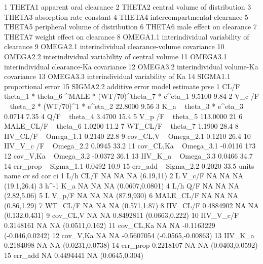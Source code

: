 \begin{Schunk}
\begin{Soutput}
1     THETA1                       apparent oral clearance
2     THETA2                central volume of distribution
3     THETA3                      absorption rate constant
4     THETA4                  intercompartmental clearance
5     THETA5             peripheral volume of distribution
6     THETA6                      male effect on clearance
7     THETA7                    weight effect on clearance
8   OMEGA1.1      interindividual variability of clearance
9   OMEGA2.1   interindividual clearance-volume covariance
10  OMEGA2.2 interindividual variability of central volume
11  OMEGA3.1       interindividual clearance-Ka covariance
12  OMEGA3.2          interindividual volume-Ka covariance
13  OMEGA3.3             interindividual variability of Ka
14  SIGMA1.1                            proportional error
15  SIGMA2.2                                additive error
                                                           model estimate prse
1  CL/F  ~ theta_1 *  theta_6 ^MALE * (WT/70)^theta_7  * e^eta_1   9.5100 9.84
2                        V_c /F  ~ theta_2 * (WT/70)^1 * e^eta_2  22.8000 9.56
3                                       K_a  ~ theta_3 * e^eta_3   0.0714 7.35
4                                                 Q/F  ~ theta_4   3.4700 15.4
5                                              V_p /F  ~ theta_5 113.0000   21
6                                            MALE_CL/F ~ theta_6   1.0200 11.2
7                                              WT_CL/F ~ theta_7   1.1900 28.4
8                                           IIV_CL/F ~ Omega_1.1   0.2140 22.8
9                                           cov_CL,V ~ Omega_2.1   0.1210 26.4
10                                        IIV_V_c /F ~ Omega_2.2   0.0945 33.2
11                                        cov_CL,Ka  ~ Omega_3.1  -0.0116  173
12                                         cov_V,Ka  ~ Omega_3.2  -0.0372 36.1
13                                          IIV_K_a  ~ Omega_3.3   0.0466 34.7
14                                          err_prop ~ Sigma_1.1   0.0492 10.9
15                                           err_add ~ Sigma_2.2   0.2020 33.5
   units      name        cv        sd        cor                 ci
1    L/h      CL/F        NA        NA         NA          (6.19,11)
2      L     V_c/F        NA        NA         NA        (19.1,26.4)
3  h^-1        K_a        NA        NA         NA    (0.0607,0.0801)
4    L/h       Q/F        NA        NA         NA        (2.82,5.06)
5      L     V_p/F        NA        NA         NA         (87.9,930)
6        MALE_CL/F        NA        NA         NA        (0.86,1.29)
7          WT_CL/F        NA        NA         NA       (0.571,1.87)
8         IIV_CL/F 0.4884902        NA         NA      (0.132,0.431)
9         cov_CL,V        NA        NA  0.8492811     (0.0663,0.222)
10       IIV_V_c/F 0.3148161        NA         NA     (0.0511,0.162)
11       cov_CL,Ka        NA        NA -0.1163229    (-0.046,0.0242)
12        cov_V,Ka        NA        NA -0.5607054 (-0.0565,-0.00863)
13         IIV_K_a 0.2184098        NA         NA    (0.0231,0.0738)
14        err_prop 0.2218107        NA         NA    (0.0403,0.0592)
15         err_add        NA 0.4494441         NA     (0.0645,0.304)
\end{Soutput}
\end{Schunk}
